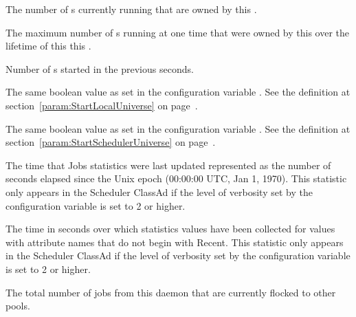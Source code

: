 \begin{description}
\item[\AdAttr{ShadowsRunning}:] The number of s currently running 
  that are owned by this .

\item[\AdAttr{ShadowsRunningPeak}:] The maximum number of s running at one time
  that were owned by this  over the lifetime of this this .

\item[\AdAttr{ShadowsStarted}:] Number of s started
  in the previous  seconds.

\item[\AdAttr{StartLocalUniverse}:] The same boolean value as set in the
  configuration variable .
  See the definition at section~\ref{param:StartLocalUniverse} on
  page~\pageref{param:StartLocalUniverse}.

\item[\AdAttr{StartSchedulerUniverse}:] The same boolean value as set in the
  configuration variable .
  See the definition at section~\ref{param:StartSchedulerUniverse} on
  page~\pageref{param:StartSchedulerUniverse}.

\item[\AdAttr{StatsLastUpdateTime}:] The time that Jobs statistics were last updated
  represented as the number of seconds elapsed since
    the Unix epoch (00:00:00 UTC, Jan 1, 1970).
  This statistic only appears in the Scheduler ClassAd if the level of
  verbosity set by the configuration variable 
  is set to 2 or higher.

\item[\AdAttr{StatsLifetime}:] The time in seconds over which statistics values have been collected
  for values with attribute names that do not begin with Recent.
  This statistic only appears in the Scheduler ClassAd if the level of
  verbosity set by the configuration variable 
  is set to 2 or higher.

\item[\AdAttr{TotalFlockedJobs}:] The total number of jobs from this
   daemon that are currently flocked to other pools.


\end{description}
